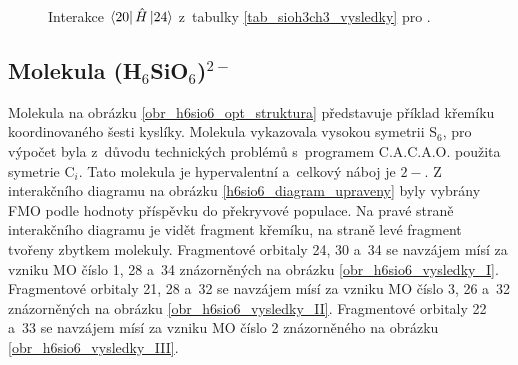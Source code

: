 \documentclass[
  printed, %
  table,   %
  lof,     %
  lot,     %
  oneside,
]{fithesis3}
\begin{document}
 
\begin{figure}
\begin{center}
\caption{Interakce $\bra{20}{\hat{H}}\ket{24}$  z~tabulky \ref{tab_sioh3ch3_vysledky} pro .}

\label{obr_sioh3ch3_vysledky_IV}\end{center}
\end{figure} 
  \subsection{Molekula (H$_6$SiO$_6$)$^{2-}$}
  Molekula  na obrázku \ref{obr_h6sio6_opt_struktura} představuje příklad křemíku koordinovaného šesti kyslíky. Molekula vykazovala vysokou symetrii S$_6$, pro výpočet byla z~důvodu technických problémů s~programem C.A.C.A.O. použita symetrie C$_i$. Tato molekula je hypervalentní a~celkový náboj je $2-$. Z interakčního diagramu na obrázku \ref{h6sio6_diagram_upraveny} byly vybrány FMO podle hodnoty příspěvku do překryvové populace. Na pravé straně interakčního diagramu je vidět fragment křemíku, na straně levé fragment tvořeny zbytkem molekuly. Fragmentové orbitaly  24, 30 a~34 se navzájem mísí za vzniku MO číslo 1, 28 a~34 znázorněných na obrázku \ref{obr_h6sio6_vysledky_I}. Fragmentové orbitaly  21, 28 a~32 se navzájem mísí za vzniku MO číslo 3, 26 a~32 znázorněných na obrázku \ref{obr_h6sio6_vysledky_II}. Fragmentové orbitaly  22 a~33 se navzájem mísí za vzniku MO číslo 2 znázorněného na obrázku \ref{obr_h6sio6_vysledky_III}. 
  
\end{document}

